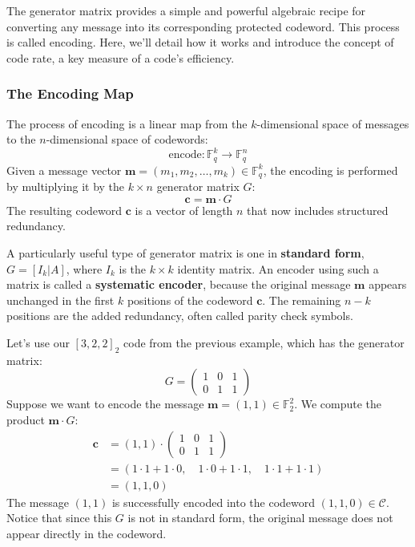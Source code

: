 \documentclass{article}
\begin{document}
The generator matrix provides a simple and powerful algebraic recipe for converting any message into its corresponding protected codeword. This process is called encoding. Here, we'll detail how it works and introduce the concept of code rate, a key measure of a code's efficiency.

\subsubsection{The Encoding Map}
The process of encoding is a linear map from the $k$-dimensional space of messages to the $n$-dimensional space of codewords:
$$
\text{encode}: \mathbb{F}_q^k \to \mathbb{F}_q^n
$$
Given a message vector $\mathbf{m} = (m_1, m_2, \dots, m_k) \in \mathbb{F}_q^k$, the encoding is performed by multiplying it by the $k \times n$ generator matrix $G$:
$$
\mathbf{c} = \mathbf{m} \cdot G
$$
The resulting codeword $\mathbf{c}$ is a vector of length $n$ that now includes structured redundancy.

A particularly useful type of generator matrix is one in \textbf{standard form}, $G = [I_k | A]$, where $I_k$ is the $k \times k$ identity matrix. An encoder using such a matrix is called a \textbf{systematic encoder}, because the original message $\mathbf{m}$ appears unchanged in the first $k$ positions of the codeword $\mathbf{c}$. The remaining $n-k$ positions are the added redundancy, often called parity check symbols.

\begin{tcolorbox}[title={Example: Encoding a Single Message}]
Let's use our $[3, 2, 2]_2$ code from the previous example, which has the generator matrix:
\[
G = \begin{pmatrix} 1 & 0 & 1 \\ 0 & 1 & 1 \end{pmatrix}
\]
Suppose we want to encode the message $\mathbf{m} = (1, 1) \in \mathbb{F}_2^2$. We compute the product $\mathbf{m} \cdot G$:
\begin{align*}
\mathbf{c} &= (1, 1) \cdot \begin{pmatrix} 1 & 0 & 1 \\ 0 & 1 & 1 \end{pmatrix} \\
&= (1 \cdot 1 + 1 \cdot 0, \quad 1 \cdot 0 + 1 \cdot 1, \quad 1 \cdot 1 + 1 \cdot 1) \\
&= (1, 1, 0)
\end{align*}
The message $(1, 1)$ is successfully encoded into the codeword $(1, 1, 0) \in \mathcal{C}$. Notice that since this $G$ is not in standard form, the original message does not appear directly in the codeword.
\end{tcolorbox}
\end{document}

